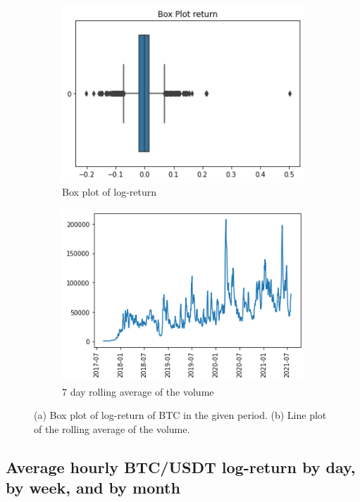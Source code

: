 \documentclass[twoside]{report}
\begin{document}
\begin{spacing}{1}
\begin{figure}[!htbp]
\centering
\begin{subfigure}{.5\textwidth}
    \centering
    \includegraphics[width=.9\linewidth]{Images/Box Plot of Return.png}
    \caption{Box plot of log-return}
    \label{log return box}
\end{subfigure}%
\begin{subfigure}{.5\textwidth}
    \centering
    \includegraphics[width=.9\linewidth]{Images/Volume Rolling Average.png}
    \caption{7 day rolling average of the volume}
    \label{7day rolling volume}
\end{subfigure}
\caption{(a) Box plot of log-return of BTC in the given period. (b) Line plot of the rolling average of the volume.}
\label{fig:test}
\end{figure}

\subsection{Average hourly BTC/USDT log-return by day, by week, and by month}


\end{spacing}
\end{document}
